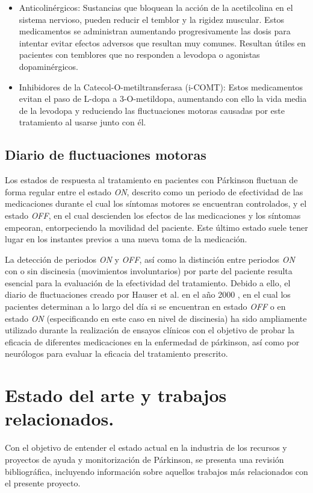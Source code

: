 \begin{itemize}
    \item Anticolinérgicos: Sustancias que bloquean la acción de la acetilcolina en el sistema nervioso, pueden reducir el temblor y la rigidez muscular. Estos medicamentos se administran aumentando progresivamente las dosis para intentar evitar efectos adversos que resultan muy comunes. Resultan útiles en pacientes con temblores que no responden a levodopa o agonistas dopaminérgicos.
    \item Inhibidores de la Catecol-O-metiltransferasa (i-COMT): Estos medicamentos evitan el paso de L-dopa a 3-O-metildopa, aumentando con ello la vida media de la levodopa y reduciendo las fluctuaciones motoras causadas por este tratamiento al usarse junto con él.
    
\end{itemize}

\subsection{Diario de fluctuaciones motoras}

Los estados de respuesta al tratamiento en pacientes con Párkinson fluctuan de forma regular entre el estado \textit{ON}, descrito como un periodo de efectividad de las medicaciones durante el cual los síntomas motores se encuentran controlados, y el estado \textit{OFF}, en el cual descienden los efectos de las medicaciones y los síntomas empeoran, entorpeciendo la movilidad del paciente. Este último estado suele tener lugar en los instantes previos a una nueva toma de la medicación.

La detección de periodos \textit{ON} y \textit{OFF}, así como la distinción entre periodos \textit{ON} con o sin discinesia (movimientos involuntarios) por parte del paciente resulta esencial para la evaluación de la efectividad del tratamiento. Debido a ello, el diario de fluctuaciones creado por Hauser et al. en el año 2000 \cite{hauser2000home}, en el cual los pacientes determinan a lo largo del día si se encuentran en estado \textit{OFF} o en estado \textit{ON} (especificando en este caso en nivel de discinesia) ha sido ampliamente utilizado durante la realización de ensayos clínicos con el objetivo de probar la eficacia de diferentes medicaciones en la enfermedad de párkinson, así como por neurólogos para evaluar la eficacia del tratamiento prescrito.



\section{Estado del arte y trabajos relacionados.}
Con el objetivo de entender el estado actual en la industria de los recursos y proyectos de ayuda y monitorización de Párkinson, se presenta una revisión bibliográfica, incluyendo información sobre aquellos trabajos más relacionados con el presente proyecto.

